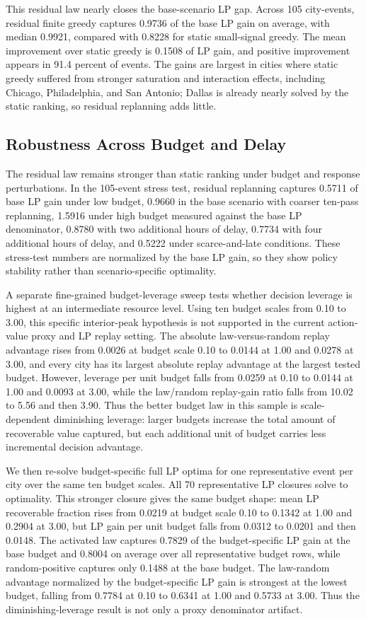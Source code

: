 This residual law nearly closes the base-scenario LP gap. Across 105 city-events, residual finite greedy captures 0.9736 of the base LP gain on average, with median 0.9921, compared with 0.8228 for static small-signal greedy. The mean improvement over static greedy is 0.1508 of LP gain, and positive improvement appears in 91.4 percent of events. The gains are largest in cities where static greedy suffered from stronger saturation and interaction effects, including Chicago, Philadelphia, and San Antonio; Dallas is already nearly solved by the static ranking, so residual replanning adds little.

\subsection{Robustness Across Budget and Delay}

The residual law remains stronger than static ranking under budget and response perturbations. In the 105-event stress test, residual replanning captures 0.5711 of base LP gain under low budget, 0.9660 in the base scenario with coarser ten-pass replanning, 1.5916 under high budget measured against the base LP denominator, 0.8780 with two additional hours of delay, 0.7734 with four additional hours of delay, and 0.5222 under scarce-and-late conditions. These stress-test numbers are normalized by the base LP gain, so they show policy stability rather than scenario-specific optimality.

A separate fine-grained budget-leverage sweep tests whether decision leverage is highest at an intermediate resource level. Using ten budget scales from 0.10 to 3.00, this specific interior-peak hypothesis is not supported in the current action-value proxy and LP replay setting. The absolute law-versus-random replay advantage rises from 0.0026 at budget scale 0.10 to 0.0144 at 1.00 and 0.0278 at 3.00, and every city has its largest absolute replay advantage at the largest tested budget. However, leverage per unit budget falls from 0.0259 at 0.10 to 0.0144 at 1.00 and 0.0093 at 3.00, while the law/random replay-gain ratio falls from 10.02 to 5.56 and then 3.90. Thus the better budget law in this sample is scale-dependent diminishing leverage: larger budgets increase the total amount of recoverable value captured, but each additional unit of budget carries less incremental decision advantage.

We then re-solve budget-specific full LP optima for one representative event per city over the same ten budget scales. All 70 representative LP closures solve to optimality. This stronger closure gives the same budget shape: mean LP recoverable fraction rises from 0.0219 at budget scale 0.10 to 0.1342 at 1.00 and 0.2904 at 3.00, but LP gain per unit budget falls from 0.0312 to 0.0201 and then 0.0148. The activated law captures 0.7829 of the budget-specific LP gain at the base budget and 0.8004 on average over all representative budget rows, while random-positive captures only 0.1488 at the base budget. The law-random advantage normalized by the budget-specific LP gain is strongest at the lowest budget, falling from 0.7784 at 0.10 to 0.6341 at 1.00 and 0.5733 at 3.00. Thus the diminishing-leverage result is not only a proxy denominator artifact.

